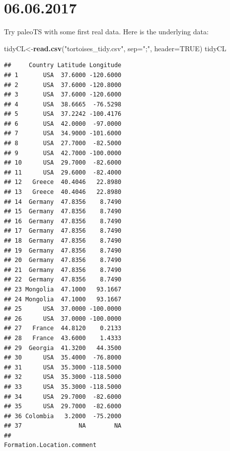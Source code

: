\documentclass[]{article}
\newenvironment{Shaded}{\begin{snugshade}}{\end{snugshade}}
\newcommand{\KeywordTok}[1]{\textcolor[rgb]{0.13,0.29,0.53}{\textbf{{#1}}}}
\newcommand{\DataTypeTok}[1]{\textcolor[rgb]{0.13,0.29,0.53}{{#1}}}
\newcommand{\StringTok}[1]{\textcolor[rgb]{0.31,0.60,0.02}{{#1}}}
\newcommand{\OtherTok}[1]{\textcolor[rgb]{0.56,0.35,0.01}{{#1}}}
\newcommand{\NormalTok}[1]{{#1}}
\begin{document}
\section{06.06.2017}\label{section-1}

Try paleoTS with some first real data. Here is the underlying data:

\begin{Shaded}
\begin{Highlighting}[]
\NormalTok{tidyCL<-}\KeywordTok{read.csv}\NormalTok{(}\StringTok{"tortoises_tidy.csv"}\NormalTok{, }\DataTypeTok{sep=}\StringTok{";"}\NormalTok{, }\DataTypeTok{header=}\OtherTok{TRUE}\NormalTok{)}
\NormalTok{tidyCL}
\end{Highlighting}
\end{Shaded}

\begin{verbatim}
##     Country Latitude Longitude
## 1       USA  37.6000 -120.6000
## 2       USA  37.6000 -120.8000
## 3       USA  37.6000 -120.6000
## 4       USA  38.6665  -76.5298
## 5       USA  37.2242 -100.4176
## 6       USA  42.0000  -97.0000
## 7       USA  34.9000 -101.6000
## 8       USA  27.7000  -82.5000
## 9       USA  42.7000 -100.0000
## 10      USA  29.7000  -82.6000
## 11      USA  29.6000  -82.4000
## 12   Greece  40.4046   22.8980
## 13   Greece  40.4046   22.8980
## 14  Germany  47.8356    8.7490
## 15  Germany  47.8356    8.7490
## 16  Germany  47.8356    8.7490
## 17  Germany  47.8356    8.7490
## 18  Germany  47.8356    8.7490
## 19  Germany  47.8356    8.7490
## 20  Germany  47.8356    8.7490
## 21  Germany  47.8356    8.7490
## 22  Germany  47.8356    8.7490
## 23 Mongolia  47.1000   93.1667
## 24 Mongolia  47.1000   93.1667
## 25      USA  37.0000 -100.0000
## 26      USA  37.0000 -100.0000
## 27   France  44.8120    0.2133
## 28   France  43.6000    1.4333
## 29  Georgia  41.3200   44.3500
## 30      USA  35.4000  -76.8000
## 31      USA  35.3000 -118.5000
## 32      USA  35.3000 -118.5000
## 33      USA  35.3000 -118.5000
## 34      USA  29.7000  -82.6000
## 35      USA  29.7000  -82.6000
## 36 Colombia   3.2000  -75.2000
## 37                NA        NA
##                                                                                                                                                                                                                                                                                                                                                                                                                                                                                                                                                                                                                                                                          Formation.Location.comment

\end{verbatim}
\end{document}
